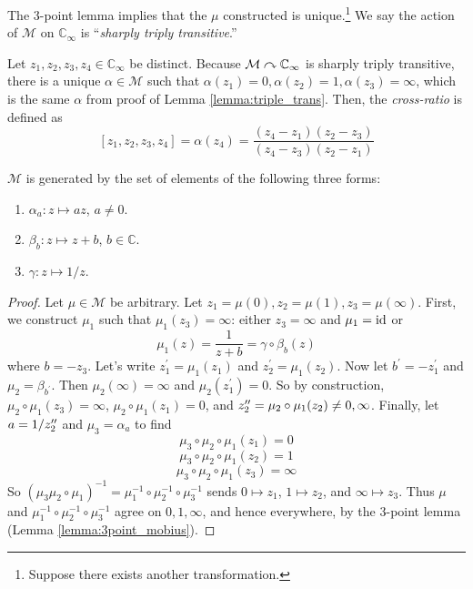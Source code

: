 \documentclass[10pt, a4paper, twoside]{report}
\begin{document}
\begin{remark}
    The 3-point lemma implies that the \(\mu\) constructed is unique.\footnote{Suppose there exists another transformation.} We say the action of \(\mathcal{M}\) on \(\mathbb{C}_\infty\) is ``\emph{sharply triply transitive}.''
\end{remark}
\begin{definition}
    Let \(z_1,z_2,z_3,z_4\in\mathbb{C}_\infty\) be distinct. Because \(\mathcal{M}\curvearrowright\mathbb{C}_\infty\) is sharply triply transitive, there is a unique \(\alpha\in\mathcal{M}\) such that \(\alpha(z_1)=0,\alpha(z_2)=1,\alpha(z_3)=\infty\), which is the same \(\alpha\) from proof of Lemma \ref{lemma:triple_trans}. Then, the \emph{cross-ratio} is defined as 
    \[[z_1,z_2,z_3,z_4]=\alpha(z_4)=\frac{(z_4-z_1)(z_2-z_3)}{(z_4-z_3)(z_2-z_1)}\]
\end{definition}
\begin{proposition}
    \(\mathcal{M}\) is generated by the set of elements of the following three forms:
    \begin{enumerate}
        \item \(\alpha_a:z\mapsto az\), \(a\neq 0\).
        \item \(\beta_b:z\mapsto z+b\), \(b\in\mathbb{C}\).
        \item \(\gamma:z\mapsto 1/z\).
    \end{enumerate}
    \label{prop:mobius_gen}
\end{proposition}
\begin{proof}
    Let \(\mu\in\mathcal{M}\) be arbitrary. Let \(z_1=\mu(0),z_2=\mu(1),z_3=\mu(\infty)\). First, we construct \(\mu_1\) such that \(\mu_1(z_3)=\infty\): either \(z_3=\infty\) and \(\mu_1=\operatorname{id}\) or 
    \[\mu_1(z)=\frac{1}{z+b}=\gamma\circ\beta_b(z)\]
    where \(b=-z_3\). Let's write \(z_1^\prime=\mu_1(z_1)\) and \(z_2^\prime=\mu_1(z_2)\). Now let \(b^\prime=-z_1^\prime\) and \(\mu_2=\beta_{b^\prime}\). Then \(\mu_2(\infty)=\infty\) and \(\mu_2(z_1^\prime)=0\). So by construction, \(\mu_2\circ\mu_1(z_3)=\infty\), \(\mu_2\circ\mu_1(z_1)=0\), and \(z_2^{\prime\prime}=\mu_2\circ\mu_1(z_2)\neq 0,\infty\). Finally, let \(a=1/z_2^{\prime\prime}\) and \(\mu_3=\alpha_a\) to find 
    \[\mu_3\circ\mu_2\circ\mu_1(z_1)=0\]
    \[\mu_3\circ\mu_2\circ\mu_1(z_2)=1\]
    \[\mu_3\circ\mu_2\circ\mu_1(z_3)=\infty\]
    So \((\mu_3\mu_2\circ\mu_1)^{-1}=\mu_1^{-1}\circ\mu_2^{-1}\circ\mu_3^{-1}\) sends \(0\mapsto z_1\), \(1\mapsto z_2\), and \(\infty\mapsto z_3\). Thus \(\mu\) and \(\mu_1^{-1}\circ\mu_2^{-1}\circ\mu_3^{-1}\) agree on \(0,1,\infty\), and hence everywhere, by the 3-point lemma (Lemma \ref{lemma:3point_mobius}).
\end{proof}
\end{document}
